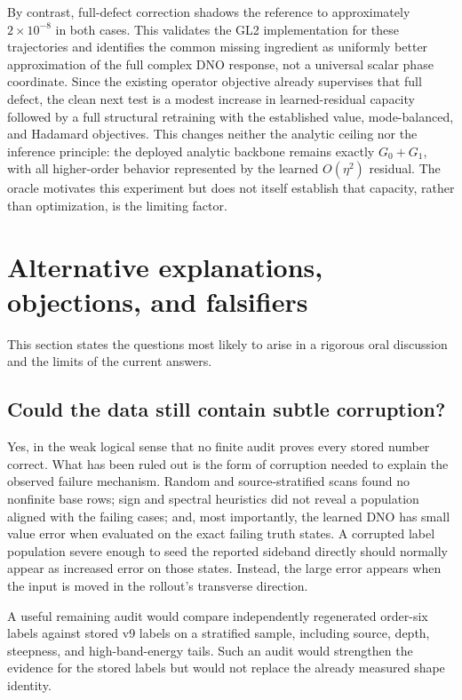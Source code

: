 \documentclass[11pt]{article}
\begin{document}
By contrast, full-defect correction shadows the reference to approximately
$2\times10^{-8}$ in both cases.  This validates the GL2 implementation for
these trajectories and identifies the common missing ingredient as uniformly
better approximation of the full complex DNO response, not a universal scalar
phase coordinate.  Since the existing operator objective already supervises
that full defect, the clean next test is a modest increase in learned-residual
capacity followed by a full structural retraining with the established value,
mode-balanced, and Hadamard objectives.  This changes neither the analytic
ceiling nor the inference principle: the deployed analytic backbone remains
exactly $G_0+G_1$, with all higher-order behavior represented by the learned
$O(\eta^2)$ residual.  The oracle motivates this experiment but does not itself
establish that capacity, rather than optimization, is the limiting factor.

\section{Alternative explanations, objections, and falsifiers}

This section states the questions most likely to arise in a rigorous oral
discussion and the limits of the current answers.

\subsection{Could the data still contain subtle corruption?}

Yes, in the weak logical sense that no finite audit proves every stored number
correct.  What has been ruled out is the form of corruption needed to explain
the observed failure mechanism.  Random and source-stratified scans found no
nonfinite base rows; sign and spectral heuristics did not reveal a population
aligned with the failing cases; and, most importantly, the learned DNO has
small value error when evaluated on the exact failing truth states.  A corrupted
label population severe enough to seed the reported sideband directly should
normally appear as increased error on those states.  Instead, the large error
appears when the input is moved in the rollout's transverse direction.

A useful remaining audit would compare independently regenerated order-six
labels against stored v9 labels on a stratified sample, including source,
depth, steepness, and high-band-energy tails.  Such an audit would strengthen
the evidence for the stored labels but would not replace the already measured
shape identity.
\end{document}
